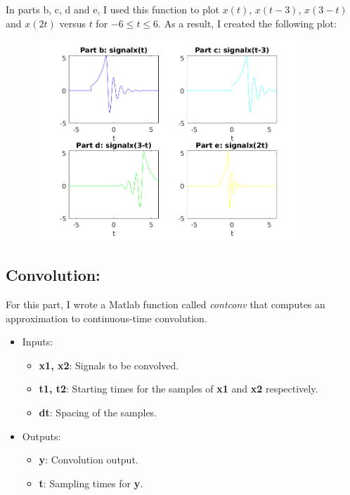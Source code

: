 \documentclass[a4paper,11pt]{article}
\begin{document}
\bigskip

In parts b, c, d and e, I used this function to plot $x(t)$, $x(t-3)$, $x(3-t)$ and $x(2t)$ versus $t$ for $-6\leq t \leq 6$. As a result, I created the following plot:

\newpage

\begin{figure}[!hp]
    \begin{center}
      \includegraphics[width=0.9\textwidth]{images/exercice_1.png}
    \end{center}
\end{figure}

\subsection{Convolution:}

For this part, I wrote a Matlab function called \textit{contconv} that computes an approximation to continuous-time convolution.

\begin{itemize}
    \item Inputs:
    \begin{itemize}
        \item \textbf{x1, x2}: Signals to be convolved.
        \item \textbf{t1, t2}: Starting times for the samples of \textbf{x1} and \textbf{x2} respectively.
        \item \textbf{dt}: Spacing of the samples.
    \end{itemize}
    \item Outputs:
    \begin{itemize}
        \item \textbf{y}: Convolution output.
        \item \textbf{t}: Sampling times for \textbf{y}.
    \end{itemize}
\end{itemize}
\end{document}
